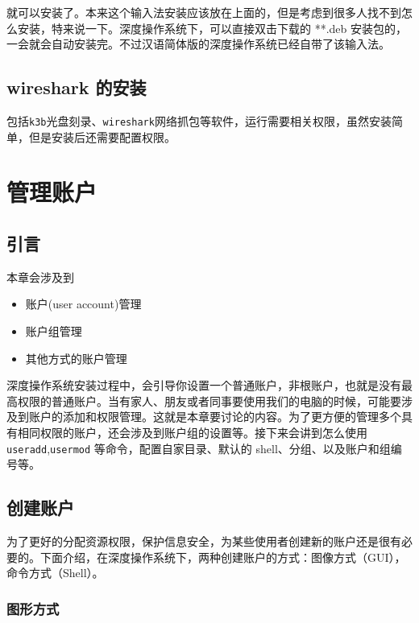 \documentclass[doctor,openright,twoside]{sjtuthesis}
\providecommand{\tightlist}{%
    \setlength{\itemsep}{0pt}\setlength{\parskip}{0pt}}
\newcommand{\passthrough}[1]{#1}
\theoremstyle{plain}
\theoremstyle{definition}
\theoremstyle{remark}
\theoremstyle{ocrenumbox}
\theoremstyle{plain}
\begin{document}
就可以安装了。本来这个输入法安装应该放在上面的，但是考虑到很多人找不到怎么安装，特来说一下。深度操作系统下，可以直接双击下载的 **.deb 安装包的，一会就会自动安装完。不过汉语简体版的深度操作系统已经自带了该输入法。

\hypertarget{wireshark-}{%
\section{wireshark 的安装}\label{wireshark-}}

包括\passthrough{\lstinline!k3b!}光盘刻录、\passthrough{\lstinline!wireshark!}网络抓包等软件，运行需要相关权限，虽然安装简单，但是安装后还需要配置权限。

\hypertarget{manager-user}{%
\chapter{管理账户}\label{manager-user}}

\hypertarget{section-116}{%
\section{引言}\label{section-116}}

本章会涉及到

\begin{itemize}
\tightlist
\item
  账户(user account)管理
\item
  账户组管理
\item
  其他方式的账户管理
\end{itemize}

深度操作系统安装过程中，会引导你设置一个普通账户，非根账户，也就是没有最高权限的普通账户。当有家人、朋友或者同事要使用我们的电脑的时候，可能要涉及到账户的添加和权限管理。这就是本章要讨论的内容。为了更方便的管理多个具有相同权限的账户，还会涉及到账户组的设置等。接下来会讲到怎么使用 \passthrough{\lstinline!useradd!},\passthrough{\lstinline!usermod!} 等命令，配置自家目录、默认的 shell、分组、以及账户和组编号等。

\hypertarget{section-117}{%
\section{创建账户}\label{section-117}}

为了更好的分配资源权限，保护信息安全，为某些使用者创建新的账户还是很有必要的。下面介绍，在深度操作系统下，两种创建账户的方式：图像方式（GUI），命令方式（Shell）。

\hypertarget{section-118}{%
\subsection{图形方式}\label{section-118}}
\end{document}
